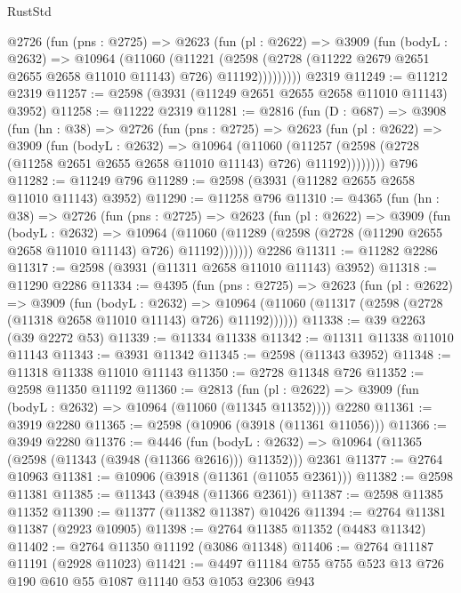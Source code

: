 \begin{lexlean}{RustStd}
\begin{coremodule}
        @2726
          (fun (pns : @2725) =>
          @2623
            (fun (pl : @2622) =>
            @3909
              (fun (bodyL : @2632) =>
              @10964
                (@11060
                  (@11221
                    (@2598
                      (@2728 (@11222 @2679 @2651 @2655 @2658 @11010 @11143) @726)
                      @11192)))))))))
    @2319
@11249 := @11212 @2319
@11257 := @2598 (@3931 (@11249 @2651 @2655 @2658 @11010 @11143) @3952)
@11258 := @11222 @2319
@11281 := @2816
    (fun (D : @687) =>
    @3908
      (fun (hn : @38) =>
      @2726
        (fun (pns : @2725) =>
        @2623
          (fun (pl : @2622) =>
          @3909
            (fun (bodyL : @2632) =>
            @10964
              (@11060
                (@11257 (@2598 (@2728 (@11258 @2651 @2655 @2658 @11010 @11143) @726) @11192))))))))
    @796
@11282 := @11249 @796
@11289 := @2598 (@3931 (@11282 @2655 @2658 @11010 @11143) @3952)
@11290 := @11258 @796
@11310 := @4365
    (fun (hn : @38) =>
    @2726
      (fun (pns : @2725) =>
      @2623
        (fun (pl : @2622) =>
        @3909
          (fun (bodyL : @2632) =>
          @10964
            (@11060 (@11289 (@2598 (@2728 (@11290 @2655 @2658 @11010 @11143) @726) @11192)))))))
    @2286
@11311 := @11282 @2286
@11317 := @2598 (@3931 (@11311 @2658 @11010 @11143) @3952)
@11318 := @11290 @2286
@11334 := @4395
    (fun (pns : @2725) =>
    @2623
      (fun (pl : @2622) =>
      @3909
        (fun (bodyL : @2632) =>
        @10964 (@11060 (@11317 (@2598 (@2728 (@11318 @2658 @11010 @11143) @726) @11192))))))
@11338 := @39 @2263 (@39 @2272 @53)
@11339 := @11334 @11338
@11342 := @11311 @11338 @11010 @11143
@11343 := @3931 @11342
@11345 := @2598 (@11343 @3952)
@11348 := @11318 @11338 @11010 @11143
@11350 := @2728 @11348 @726
@11352 := @2598 @11350 @11192
@11360 := @2813
    (fun (pl : @2622) => @3909 (fun (bodyL : @2632) => @10964 (@11060 (@11345 @11352))))
    @2280
@11361 := @3919 @2280
@11365 := @2598 (@10906 (@3918 (@11361 @11056)))
@11366 := @3949 @2280
@11376 := @4446
    (fun (bodyL : @2632) => @10964 (@11365 (@2598 (@11343 (@3948 (@11366 @2616))) @11352)))
    @2361
@11377 := @2764 @10963
@11381 := @10906 (@3918 (@11361 (@11055 @2361)))
@11382 := @2598 @11381
@11385 := @11343 (@3948 (@11366 @2361))
@11387 := @2598 @11385 @11352
@11390 := @11377 (@11382 @11387) @10426
@11394 := @2764 @11381 @11387 (@2923 @10905)
@11398 := @2764 @11385 @11352 (@4483 @11342)
@11402 := @2764 @11350 @11192 (@3086 @11348)
@11406 := @2764 @11187 @11191 (@2928 @11023)
@11421 := @4497 @11184 @755 @755 @523 @13 @726 @190 @610 @55 @1087 @11140 @53 @1053 @2306 @943

\end{coremodule}
\end{lexlean}
